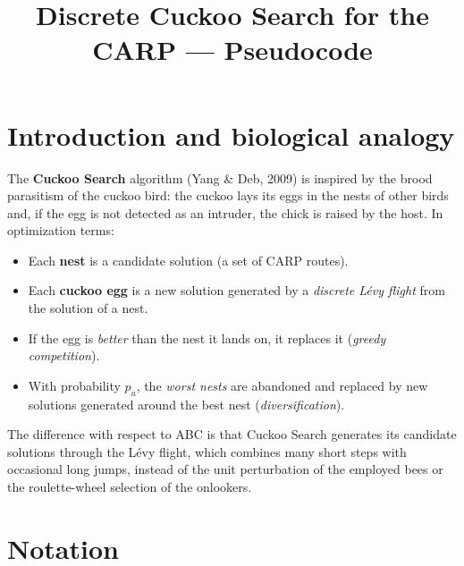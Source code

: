 \documentclass[12pt, a4paper]{article}
\title{Discrete Cuckoo Search for the CARP --- Pseudocode}
\author{}
\date{}
\begin{document}
\maketitle

\section{Introduction and biological analogy}

The \textbf{Cuckoo Search} algorithm (Yang \& Deb, 2009) is inspired by the
brood parasitism of the cuckoo bird: the cuckoo lays its eggs in the nests of
other birds and, if the egg is not detected as an intruder, the chick is raised
by the host. In optimization terms:

\begin{itemize}
    \item Each \textbf{nest} is a candidate solution (a set of CARP routes).
    \item Each \textbf{cuckoo egg} is a new solution generated by a
          \emph{discrete L\'evy flight} from the solution of a nest.
    \item If the egg is \emph{better} than the nest it lands on, it replaces it
          (\emph{greedy competition}).
    \item With probability $p_a$, the \emph{worst nests} are abandoned and
          replaced by new solutions generated around the best nest
          (\emph{diversification}).
\end{itemize}

The difference with respect to ABC is that Cuckoo Search generates its candidate
solutions through the L\'evy flight, which combines many short steps with
occasional long jumps, instead of the unit perturbation of the employed bees or
the roulette-wheel selection of the onlookers.

\section{Notation}
\end{document}
